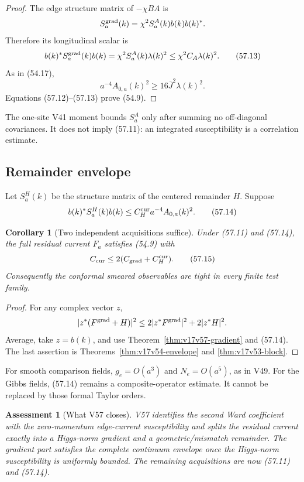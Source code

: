 \documentclass[11pt]{article}
\newtheorem{corollary}[theorem]{Corollary}
\newtheorem{assessment}[theorem]{Assessment}
\theoremstyle{remark}
\begin{document}
\begin{proof}
The edge structure matrix of \(-\chi BA\) is
\[
 S_a^{\rm grad}(k)
 =
 \chi^2S_a^A(k)b(k)b(k)^*.
\]
Therefore its longitudinal scalar is
\[
 b(k)^*S_a^{\rm grad}(k)b(k)
 =
 \chi^2S_a^A(k)\lambda(k)^2
 \leq\chi^2C_A\lambda(k)^2.                      \tag{57.13}
\]
As in (54.17),
\[
 a^{-4}A_{0,a}(k)^2
 \geq16\bar J^2\lambda(k)^2.
\]
Equations (57.12)--(57.13) prove (54.9).
\end{proof}

The one-site V41 moment bounds \(S_a^A\) only after summing no
off-diagonal covariances.  It does not imply (57.11): an integrated
susceptibility is a correlation estimate.

\subsection{Remainder envelope}

Let \(S_a^H(k)\) be the structure matrix of the centered remainder
\(H\).  Suppose
\[
 b(k)^*S_a^H(k)b(k)
 \leq
 C_H^{\rm cur}a^{-4}A_{0,a}(k)^2.                 \tag{57.14}
\]

\begin{corollary}[Two independent acquisitions suffice]
\label{cor:v17v57-two}
Under (57.11) and (57.14), the full residual current \(F_a\) satisfies
(54.9) with
\[
 C_{\rm cur}
 \leq2(C_{\rm grad}+C_H^{\rm cur}).               \tag{57.15}
\]
Consequently the conformal smeared observables are tight in every
finite test family.
\end{corollary}

\begin{proof}
For any complex vector \(z\),
\[
 |z^*(F^{\rm grad}+H)|^2
 \leq2|z^*F^{\rm grad}|^2+2|z^*H|^2.
\]
Average, take \(z=b(k)\), and use
Theorem~\ref{thm:v17v57-gradient} and (57.14).
The last assertion is Theorems~\ref{thm:v17v54-envelope} and
\ref{thm:v17v53-block}.
\end{proof}

For smooth comparison fields, \(g_e=O(a^3)\) and
\(N_e=O(a^5)\), as in V49.  For the Gibbs fields, (57.14) remains a
composite-operator estimate.  It cannot be replaced by those formal
Taylor orders.

\begin{assessment}[What V57 closes]
\label{ass:v17v57-status}
V57 identifies the second Ward coefficient with the zero-momentum
edge-current susceptibility and splits the residual current exactly
into a Higgs-norm gradient and a geometric/mismatch remainder.  The
gradient part satisfies the complete continuum envelope once the
Higgs-norm susceptibility is uniformly bounded.  The remaining
acquisitions are now (57.11) and (57.14).
\end{assessment}
\end{document}
